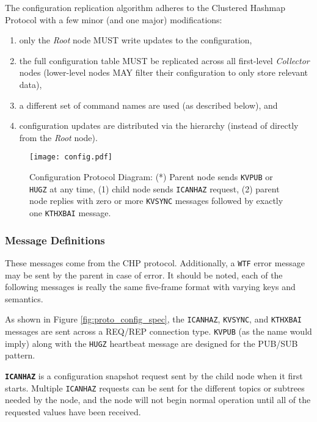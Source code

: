 The \dcamp configuration replication algorithm adheres to the Clustered Hashmap Protocol\cite{chp} with a few minor
(and one major) modifications:

\begin{enumerate}
\item only the \textit{Root} node MUST write updates to the configuration,
\item the full configuration table MUST be replicated across all first-level \textit{Collector} nodes (lower-level nodes
      MAY filter their configuration to only store relevant data),
\item a different set of command names are used (as described below), and
\item configuration updates are distributed via the \dcamp hierarchy (instead of directly from the \textit{Root} node).
\end{enumerate}

\begin{figure}[H]
    \centering
    \texttt{[image: config.pdf]}
    \caption[Configuration Protocol Diagram]
	    {Configuration Protocol Diagram: (*) Parent node sends \texttt{KVPUB} or \texttt{HUGZ} at any time, (1)
	     child node sends \texttt{ICANHAZ} request, (2) parent node replies with zero or more \texttt{KVSYNC}
	     messages followed by exactly one \texttt{KTHXBAI} message.}
    \label{fig:proto_config_image}
\end{figure}

\subsubsection{Message Definitions}

These messages come from the CHP protocol. Additionally, a \texttt{WTF} error message may be sent by the parent in case
of error. It should be noted, each of the following messages is really the same five-frame format with varying keys and
semantics.

As shown in Figure \ref{fig:proto_config_spec}, the \texttt{ICANHAZ}, \texttt{KVSYNC}, and \texttt{KTHXBAI} messages are
sent across a REQ/REP connection type. \texttt{KVPUB} (as the name would imply) along with the \texttt{HUGZ} heartbeat
message are designed for the PUB/SUB pattern.

\textbf{\texttt{ICANHAZ}} is a configuration snapshot request sent by the child node when it first starts. Multiple
\texttt{ICANHAZ} requests can be sent for the different topics or subtrees needed by the node, and the node will not
begin normal operation until all of the requested values have been received.

